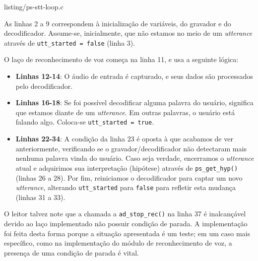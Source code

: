 \begin{minipage}{\linewidth}

  {listing/ps-stt-loop.c}
\end{minipage}

As linhas 2 a 9 correspondem à inicialização de variáveis, do gravador e do decodificador. Assume-se, inicialmente, que não estamos no meio de um \textit{utterance} através de \texttt{utt\_started = false} (linha 3).

O laço de reconhecimento de voz começa na linha 11, e usa a seguinte lógica:

\begin{itemize}
\item \textbf{Linhas 12-14}: O áudio de entrada é capturado, e seus dados são processados pelo decodificador.

\item \textbf{Linhas 16-18}: Se foi possível decodificar alguma palavra do usuário, significa que estamos diante de um \textit{utterance}. Em outras palavras, o usuário está falando algo. Coloca-se \texttt{utt\_started = true}.

\item \textbf{Linhas 22-34}: A condição da linha 23 é oposta à que acabamos de ver anteriormente, verificando se o gravador/decodificador não detectaram mais nenhuma palavra vinda do usuário. Caso seja verdade, encerramos o \textit{utterance} atual e adquirimos sua interpretação (hipótese) através de \texttt{ps\_get\_hyp()} (linhas 26 a 28). Por fim, reiniciamos o decodificador para captar um novo \textit{utterance}, alterando \texttt{utt\_started} para \texttt{false} para refletir esta mudança (linhas 31 a 33).
\end{itemize}

O leitor talvez note que a chamada a \texttt{ad\_stop\_rec()} na linha 37 é inalcançável devido ao laço implementado não possuir condição de parada. A implementação foi feita desta forma porque a situação apresentada é um teste; em um caso mais específico, como na implementação do módulo de reconhecimento de voz, a presença de uma condição de parada é vital.
